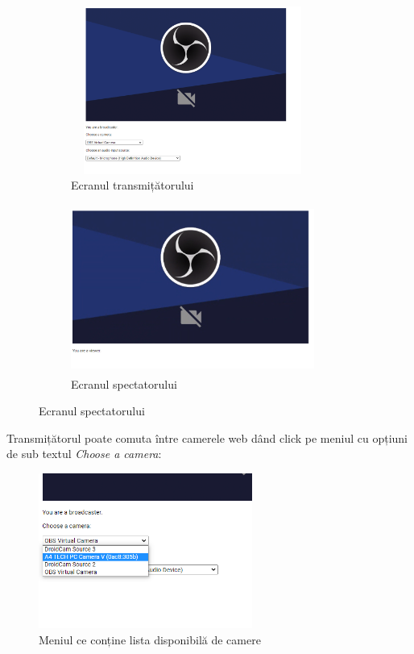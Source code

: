 \begin{figure}[H]
    \centering
    \begin{subfigure}{0.45\textwidth}
        \centering
        \includegraphics[width=8cm, height=5.5cm]{figures/app_broadcaster_mode.png}
        \caption{Ecranul transmițătorului}
    \end{subfigure}
    \hfill
    \begin{subfigure}{0.45\textwidth}
        \centering
        \includegraphics[width=8cm, height=5.5cm]{figures/app_viewer_mode.png}
        \caption{Ecranul spectatorului}
    \end{subfigure}
\end{figure}
\indent \par Transmițătorul poate comuta între camerele web dând click pe meniul cu opțiuni de sub textul \textit{Choose a camera}:
\begin{figure}[H]
    \centering
    \includegraphics[width=7cm]{figures/app_pick_camera.png}
    \caption{Meniul ce conține lista disponibilă de camere}
\end{figure}

